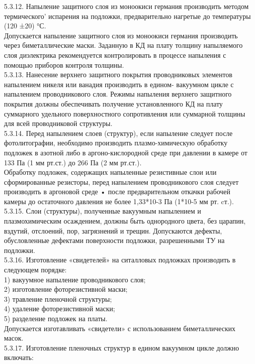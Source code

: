 \documentclass{bmstu}
\begin{document}
	5.3.12. Напыление защитного слоя из моноокиси германия производить методом термического' испарения на подложки, предварительно нагретые до температуры (120 ±20) °С. \\
	Допускается напыление защитного слоя из моноокиси германия производить через биметаллические маски. Заданную в КД на плату толщину напыляемого слоя диэлектрика рекомендуется контролировать в процессе напыления с помощью приборов контроля толщины. \\
	5.3.13. Нанесение верхнего защитного покрытия проводниковых элементов напылением никеля или ванадия производить в едином- вакуумном  цикле с напылением  проводникового слоя. Режимы напыления верхнего защитного покрытия должны обеспечивать получение установленного КД на плату суммарного удельного поверхностного сопротивления или суммарной толщины для всей проводниковой структуры. \\
	5.3.14. Перед напылением слоев (структур), если напыление следует после фотолитографии, необходимо производить плазмо-химическую обработку подложек в азотной либо в аргоно-кислородной среде при давлении в камере от  133 Па (1 мм рт.ст.) до 266 Па (2 мм рт.ст.). \\
	Обработку подложек, содержащих напыленные резистивные слои или сформированные резисторы, перед напылением проводникового слоя следует производить в аргоновой среде • после предварительном откачки рабочей камеры до остаточного давления не более 1,33*10-3  Па  (1*10-5  мм рт. cт.). \\
	5.3.15. Слои (структуры), полученные вакуумным напылением и плазмохимическим осаждением, должны быть однородного цвета, без царапин, вздутий, отслоений, пор, загрязнений и трещин. Допускаются дефекты, обусловленные дефектами поверхности подложки, разрешенными ТУ на подложки. \\
	5.3.16. Изготовление «свидетелей» на ситалловых подложках производить в следующем порядке: \\
	1) вакуумное напыление проводникового слоя; \\
	2) изготовление фоторезистивной маски; \\
	3) травление пленочной структуры; \\
	4) удаление фоторезистивной маски; \\
	5) разделение подложек на платы. \\
	Допускается изготавливать «свидетели» с использованием биметаллических масок. \\
	5.3.17. Изготовление пленочных структур в едином вакуумном цикле должно включать: \\
\end{document}
